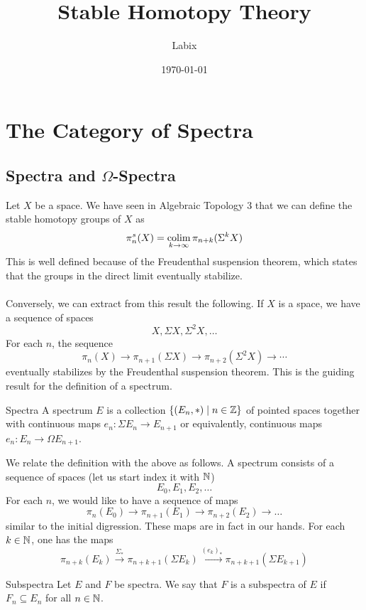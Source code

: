 \documentclass[a4paper]{article}
\title{Stable Homotopy Theory}
\author{Labix}
\date{\today}
\begin{document}
\maketitle
\begin{abstract}
\begin{itemize}
\end{itemize}
\end{abstract}
\pagebreak
\tableofcontents

\pagebreak
\section{The Category of Spectra}
\subsection{Spectra and $\Omega$-Spectra}
Let $X$ be a space. We have seen in Algebraic Topology 3 that we can define the stable homotopy groups of $X$ as $$\pi_n^s(X)=\operatorname*{colim}_{k\to\infty}\pi_{n+k}(\Sigma^kX)$$ This is well defined because of the Freudenthal suspension theorem, which states that the groups in the direct limit eventually stabilize. \\~\\

Conversely, we can extract from this result the following. If $X$ is a space, we have a sequence of spaces $$X,\Sigma X,\Sigma^2X,\dots$$ For each $n$, the sequence $$\pi_n(X)\to\pi_{n+1}(\Sigma X)\to\pi_{n+2}(\Sigma^2X)\to\cdots$$ eventually stabilizes by the Freudenthal suspension theorem. This is the guiding result for the definition of a spectrum. 

\begin{defn}{Spectra}{} A spectrum $E$ is a collection $\{(E_n,\ast)\;|\;n\in\mathbb{Z}\}$ of pointed spaces together with continuous maps $e_n:\Sigma E_n\to E_{n+1}$ or equivalently, continuous maps $e_n:E_n\to\Omega E_{n+1}$. 
\end{defn}

We relate the definition with the above as follows. A spectrum consists of a sequence of spaces (let us start index it with $\mathbb{N}$) $$E_0,E_1,E_2,\dots$$ For each $n$, we would like to have a sequence of maps $$\pi_n(E_0)\to\pi_{n+1}(E_1)\to\pi_{n+2}(E_2)\to\dots$$ similar to the initial digression. These maps are in fact in our hands. For each $k\in\mathbb{N}$, one has the maps $$\pi_{n+k}(E_k)\overset{\Sigma_\ast}{\to}\pi_{n+k+1}(\Sigma E_k)\overset{(e_k)_\ast}{\to}\pi_{n+k+1}(\Sigma E_{k+1})$$ 

\begin{defn}{Subspectra}{} Let $E$ and $F$ be spectra. We say that $F$ is a subspectra of $E$ if $F_n\subseteq E_n$ for all $n\in\mathbb{N}$. 
\end{defn}
\end{document}
